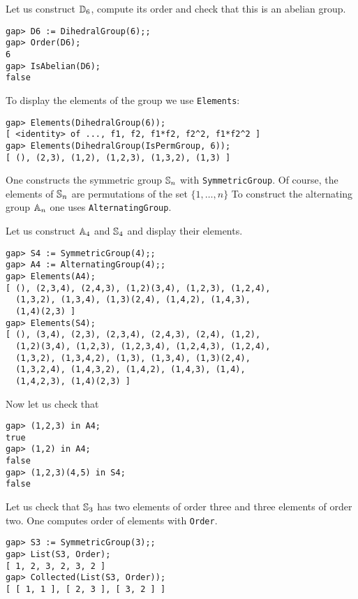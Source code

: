 \begin{example}
Let us construct $\mathbb{D}_6$, compute its order and check that this is an abelian group. 
\begin{lstlisting}
gap> D6 := DihedralGroup(6);;
gap> Order(D6);
6
gap> IsAbelian(D6);
false
\end{lstlisting}
To display the elements of the group we use 
\lstinline{Elements}: 
\begin{lstlisting}
gap> Elements(DihedralGroup(6));
[ <identity> of ..., f1, f2, f1*f2, f2^2, f1*f2^2 ]
gap> Elements(DihedralGroup(IsPermGroup, 6));
[ (), (2,3), (1,2), (1,2,3), (1,3,2), (1,3) ]
\end{lstlisting}
\end{example}

One constructs the symmetric group $\mathbb{S}_n$ with \lstinline{SymmetricGroup}.
Of course, the elements of $\mathbb{S}_n$ are permutations of the set $\{1,\dots,n\}$
To construct the alternating group $\mathbb{A}_n$ one uses
\lstinline{AlternatingGroup}. 

\begin{example}
Let us construct $\mathbb{A}_4$ and $\mathbb{S}_4$ and display their elements. 
\begin{lstlisting}
gap> S4 := SymmetricGroup(4);;
gap> A4 := AlternatingGroup(4);;
gap> Elements(A4);
[ (), (2,3,4), (2,4,3), (1,2)(3,4), (1,2,3), (1,2,4), 
  (1,3,2), (1,3,4), (1,3)(2,4), (1,4,2), (1,4,3), 
  (1,4)(2,3) ]
gap> Elements(S4);
[ (), (3,4), (2,3), (2,3,4), (2,4,3), (2,4), (1,2), 
  (1,2)(3,4), (1,2,3), (1,2,3,4), (1,2,4,3), (1,2,4), 
  (1,3,2), (1,3,4,2), (1,3), (1,3,4), (1,3)(2,4), 
  (1,3,2,4), (1,4,3,2), (1,4,2), (1,4,3), (1,4), 
  (1,4,2,3), (1,4)(2,3) ]
\end{lstlisting}
Now let us check that 
\begin{lstlisting}
gap> (1,2,3) in A4;
true
gap> (1,2) in A4;
false
gap> (1,2,3)(4,5) in S4;
false
\end{lstlisting}
\end{example}

\begin{example}
Let us check that $\mathbb{S}_3$ has two elements of order three and three elements of order two. 
One computes order of elements with \lstinline{Order}. 
\begin{lstlisting}
gap> S3 := SymmetricGroup(3);;
gap> List(S3, Order);
[ 1, 2, 3, 2, 3, 2 ]
gap> Collected(List(S3, Order));
[ [ 1, 1 ], [ 2, 3 ], [ 3, 2 ] ]
\end{lstlisting}
\end{example}


